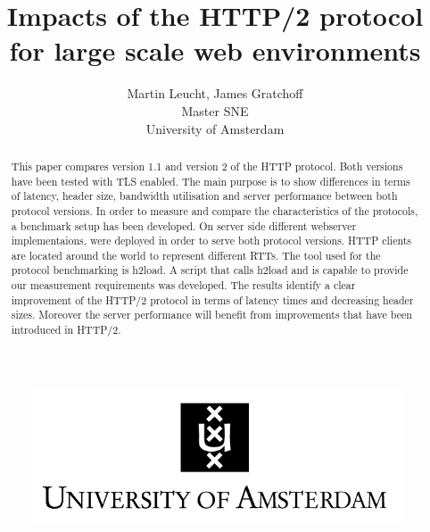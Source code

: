 \documentclass[10pt]{article}
\begin{document}
 
\begin{figure}[!bh]
 	\begin{center}
 	 
 		\huge \title{Impacts of the HTTP/2 protocol for large scale web environments}
		\author{Martin Leucht, James Gratchoff \\
		Master SNE \\ University of Amsterdam} 
		\includegraphics{images/uva.jpeg}
	\maketitle 
		\label{sec:uva}
	\end{center}
\end{figure}
\setlength{\columnsep}{2cm}
\def\columnseprulecolor{\color{blue}}
 
\newpage
\begin{abstract}
This paper compares version 1.1 and version 2 of the HTTP protocol. Both versions have been tested with TLS enabled. The main purpose is to show differences in terms of latency, header size, bandwidth utilisation and server performance between both protocol versions. In order to measure and compare the characteristics of the protocols, a benchmark setup  has been developed. On server side different webserver implementaions, were deployed in order to serve both protocol versions. HTTP clients are located around the world to represent different RTTs. The tool used for the protocol benchmarking is h2load. A script that calls h2load and is capable to provide our measurement requirements was developed. The results identify a clear improvement of the HTTP/2 protocol in terms of latency times and decreasing  header sizes. Moreover the server performance will benefit from improvements that have been introduced in HTTP/2.
\end{abstract}

\newpage
\tableofcontents

\newpage
\newpage







\newpage




\newpage

\newpage

\newpage

\newpage

\end{document}
